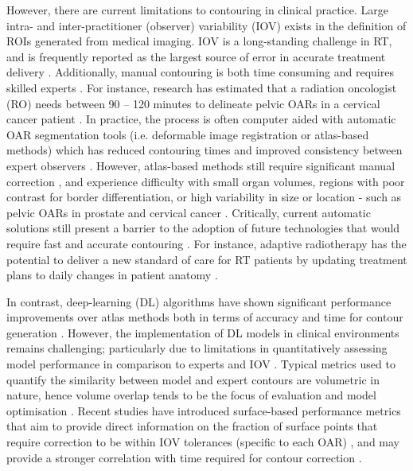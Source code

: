 However, there are current limitations to contouring in clinical practice. Large
intra- and inter-practitioner (observer) variability (IOV) exists in the
definition of ROIs generated from medical imaging. IOV is a long-standing
challenge in RT, and is frequently reported as the largest source of error in
accurate treatment delivery \cite{Vinod_2016, tg100}. Additionally, manual
contouring is both time consuming and requires skilled experts
\cite{Nikolov_2018}. For instance, research has estimated that a radiation
oncologist (RO) needs between 90 -- 120 minutes to delineate pelvic OARs in a
cervical cancer patient \cite{Liu_2020}. In practice, the process is often
computer aided with automatic OAR segmentation tools (i.e. deformable image
registration or atlas-based methods) which has reduced contouring times and
improved consistency between expert observers \cite{Vinod_2016}. However,
atlas-based methods still require significant manual correction 
\cite{Nikolov_2018}, and experience difficulty with small organ volumes, regions
with poor contrast for border differentiation, or high variability in size or location
- such as pelvic OARs in prostate and cervical cancer \cite{Schreier_2020,
Liu_2020}. Critically, current automatic solutions still present a barrier to
the adoption of future technologies that would require fast and accurate
contouring \cite{Nikolov_2018}. For instance, adaptive radiotherapy has the 
potential to deliver a new standard of care for RT patients by updating
treatment plans to daily changes in patient anatomy \cite{Nikolov_2018}.

In contrast, deep-learning (DL) algorithms have shown significant performance
improvements over atlas methods both in terms of accuracy and time for contour
generation \cite{Liu_2020}. However, the implementation of DL models in clinical
environments remains challenging; particularly due to limitations in
quantitatively assessing model performance in comparison to experts and IOV
\cite{Nikolov_2018}. Typical metrics used to quantify the similarity between
model and expert contours are volumetric in nature, hence volume overlap tends
to be the focus of evaluation and model optimisation \cite{Nikolov_2018}. Recent
studies have introduced surface-based performance metrics that aim to provide
direct information on the fraction of surface points that require correction to
be within IOV tolerances (specific to each OAR) \cite{Nikolov_2018,
  Vaassen_2020}, and may provide a stronger correlation with time required for
contour correction \cite{Vaassen_2020}.

